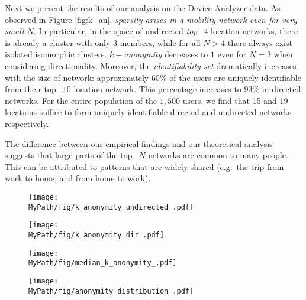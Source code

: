 Next we present the results of our analysis on the Device Analyzer data.
As observed in Figure \ref{fig:k_an}, \emph{sparsity arises in a mobility network even for very small $ N $}.
In particular, in the space of undirected \emph{top$-4$} location networks, there is already a cluster with only $ 3 $ members, while for all $ N > 4 $ there always exist isolated isomorphic clusters.
\emph{$ k-$anonymity} decreases to $ 1 $ even for $ N=3 $ when considering directionality.
Moreover, the \emph{identifiability set} dramatically increases with the size of network: approximately $ 60\% $ of the users are uniquely identifiable from their top$-10$ location network.
This percentage increases to $93\%$ in directed networks.
For the entire population of the $ 1,500 $ users, we find that 15 and 19 locations suffice to form uniquely identifiable directed and undirected networks respectively.

The difference between our empirical findings and our theoretical analysis suggests that large parts of the top$-N$ networks are common to many people.
This can be attributed to patterns that are widely shared (e.g.\ the trip from work to home, and from home to work).

\begin{figure*}[!t]
	\begin{subfigure}[t]{0.49\textwidth}
		\centering
		\texttt{[image: \\MyPath/fig/k\_anonymity\_undirected\_.pdf]}
		\caption{}
		\label{fig:k_an_un}
	\end{subfigure}%
	\begin{subfigure}[t]{0.49\textwidth}
		\centering
		\texttt{[image: \\MyPath/fig/k\_anonymity\_dir\_.pdf]}
		\caption{}
		\label{fig:k_an_dir}
	\end{subfigure}%
	\caption{{Identifiability set and $k-$anonymity for undirected and directed top$-N$ mobility networks for increasing number of nodes. Displayed is also the theoretical upper bound of identifiability for networks with $ N $ nodes.}
	}
	\label{fig:k_an}
\end{figure*}


\begin{figure*}[!t]
	\begin{subfigure}[t]{0.49\textwidth}
		\centering
		\texttt{[image: \\MyPath/fig/median\_k\_anonymity\_.pdf]}
		\caption{}
		\label{fig:k_an_med}
	\end{subfigure}
	\begin{subfigure}[t]{0.49\textwidth}
		\centering
		\texttt{[image: \\MyPath/fig/anonymity\_distribution\_.pdf]}
		\caption{}
		\label{fig:anon_distribution}
	\end{subfigure}
	\caption{{Anonymity size statistics over the population of top$-N$ mobility networks for increasing network size.}}
	\label{fig:k_an_stats}
\end{figure*}


